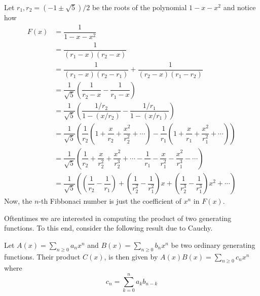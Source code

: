 \begin{solution}
Let $r_1,r_2 = (-1\pm\sqrt{5})/2$ be the roots of the polynomial $1-x-x^2$ and notice how
\begin{align*}
    F(x) &= \dfrac{1}{1-x-x^2} \\
    &= \dfrac{1}{(r_1-x)(r_2-x)} \\
    &= \dfrac{1}{(r_1-x)(r_2-r_1)}+\dfrac{1}{(r_2-x)(r_1-r_2)} \\
    &= \dfrac{1}{\sqrt{5}}\left(\dfrac{1}{r_2-x}-\dfrac{1}{r_1-x}\right) \\
    &= \dfrac{1}{\sqrt{5}} \left(\dfrac{1/r_2}{1-(x/r_2)}-\dfrac{1/r_1}{1-(x/r_1)}\right) \\
    &= \dfrac{1}{\sqrt{5}} \left(\dfrac{1}{r_2}\left(1+\dfrac{x}{r_2}+\dfrac{x^2}{r_2^2}+\cdots\right)-\dfrac{1}{r_1}\left(1+\dfrac{x}{r_1}+\dfrac{x^2}{r_1^2}+\cdots\right)\right) \\
    &= \dfrac{1}{\sqrt{5}}\left(\dfrac{1}{r_2}+\dfrac{x}{r_2^2}+\dfrac{x^2}{r_2^3}+\cdots - \dfrac{1}{r_1}-\dfrac{x}{r_1^2}-\dfrac{x^2}{r_1^3}-\cdots\right) \\
    &= \dfrac{1}{\sqrt{5}}\left(\left(\dfrac{1}{r_2}-\dfrac{1}{r_1}\right)+\left(\dfrac{1}{r_2^2}-\dfrac{1}{r_1^2}\right)x+\left(\dfrac{1}{r_2^3}-\dfrac{1}{r_1^3}\right)x^2+\cdots\right)
\end{align*}
Now, the $n$-th Fibbonaci number is just the coefficient of $x^n$ in $F(x)$. 
\end{solution}
Oftentimes we are interested in computing the product of two generating functions. To this end, consider the following result due to Cauchy. 
\begin{claim}
Let $A(x) = \sum_{n\geq 0}a_nx^n$ and $B(x)=\sum_{n\geq 0}b_nx^n$ be two ordinary generating functions. Their product $C(x)$, is then given by $A(x)B(x)=\sum_{n\geq 0}c_nx^n$ where \[
c_n = \sum_{k=0}^{n}a_kb_{n-k}
\]
\end{claim}
\endinput